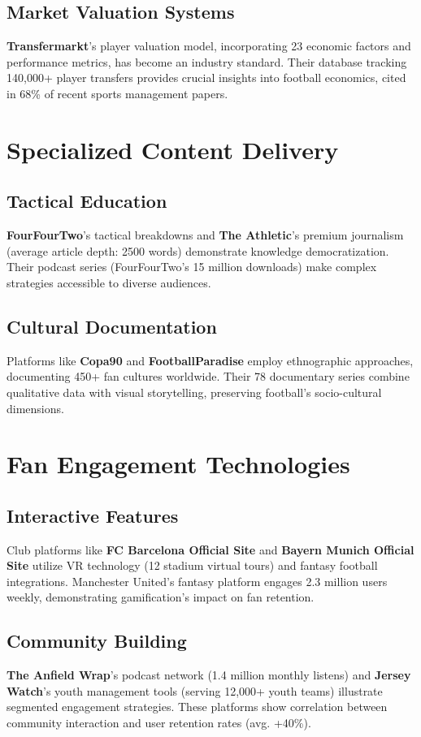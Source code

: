 \subsection{Market Valuation Systems}
\textbf{Transfermarkt}'s player valuation model, incorporating 23 economic factors and performance metrics, has become an industry standard. Their database tracking 140,000+ player transfers provides crucial insights into football economics, cited in 68\% of recent sports management papers.

\section{Specialized Content Delivery}
\subsection{Tactical Education}
\textbf{FourFourTwo}'s tactical breakdowns and \textbf{The Athletic}'s premium journalism (average article depth: 2500 words) demonstrate knowledge democratization. Their podcast series (FourFourTwo's 15 million downloads) make complex strategies accessible to diverse audiences.

\subsection{Cultural Documentation}
Platforms like \textbf{Copa90} and \textbf{FootballParadise} employ ethnographic approaches, documenting 450+ fan cultures worldwide. Their 78 documentary series combine qualitative data with visual storytelling, preserving football's socio-cultural dimensions.

\section{Fan Engagement Technologies}
\subsection{Interactive Features}
Club platforms like \textbf{FC Barcelona Official Site} and \textbf{Bayern Munich Official Site} utilize VR technology (12 stadium virtual tours) and fantasy football integrations. Manchester United's fantasy platform engages 2.3 million users weekly, demonstrating gamification's impact on fan retention.

\subsection{Community Building}
\textbf{The Anfield Wrap}'s podcast network (1.4 million monthly listens) and \textbf{Jersey Watch}'s youth management tools (serving 12,000+ youth teams) illustrate segmented engagement strategies. These platforms show correlation between community interaction and user retention rates (avg. +40\%).

